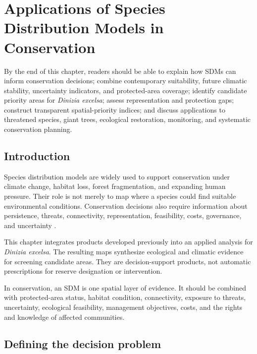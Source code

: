\chapter[Conservation applications]{Applications of Species Distribution Models in Conservation}

\begin{objetivos}
By the end of this chapter, readers should be able to explain how SDMs can inform conservation decisions; combine contemporary suitability, future climatic stability, uncertainty indicators, and protected-area coverage; identify candidate priority areas for \textit{Dinizia excelsa}; assess representation and protection gaps; construct transparent spatial-priority indices; and discuss applications to threatened species, giant trees, ecological restoration, monitoring, and systematic conservation planning.
\end{objetivos}

\section{Introduction}

Species distribution models are widely used to support conservation under climate change, habitat loss, forest fragmentation, and expanding human pressure. Their role is not merely to map where a species could find suitable environmental conditions. Conservation decisions also require information about persistence, threats, connectivity, representation, feasibility, costs, governance, and uncertainty \parencite{margules2000systematic,moilanen2009spatial,franklin2023,guisan2017habitat,zurell2020benchmarking}.

This chapter integrates products developed previously into an applied analysis for \textit{Dinizia excelsa}. The resulting maps synthesize ecological and climatic evidence for screening candidate areas. They are decision-support products, not automatic prescriptions for reserve designation or intervention.

\begin{conceito}[title={\faBook\quad SDM as conservation evidence}]
In conservation, an SDM is one spatial layer of evidence. It should be combined with protected-area status, habitat condition, connectivity, exposure to threats, uncertainty, ecological feasibility, management objectives, costs, and the rights and knowledge of affected communities.
\end{conceito}

\section{Defining the decision problem}

